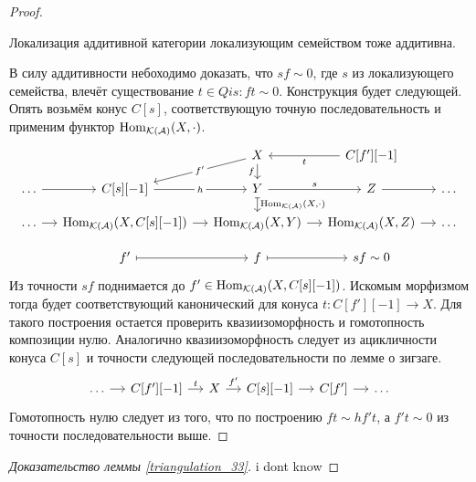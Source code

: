\documentclass[../hw_main.tex]{subfiles}
\begin{document}
\begin{proof}
\begin{to_lem}
Локализация аддитивной категории локализующим семейством тоже аддитивна.
\end{to_lem}
В силу аддитивности небоходимо доказать, что $sf\sim 0$, где $s$ из локализующего семейства, влечёт существование $t\in Qis: ft\sim 0$.
Конструкция будет следующей. Опять возьмём конус $C[s]$, соответствующую точную последовательность и применим функтор $\operatorname{Hom}_{\mathcal{K}(\mathcal{A})}(X, \cdot)$.
    \begin{equation*}
        \begin{tikzcd}[sep=small]
	&& X&C[f'][-1] \\
	\ldots & {C[s][-1]} & Y & Z & \ldots \\
	\ldots & {\Hom_{\mathcal{K}(\mathcal{A})}(X, C[s][-1])} & {\Hom_{\mathcal{K}(\mathcal{A})}(X, Y)} & {\Hom_{\mathcal{K}(\mathcal{A})}(X, Z)} & \ldots \\
	& {f'} & f & {sf\sim 0}
    \arrow[from=1-4, to=1-3, "t"]
	\arrow["h"{description}, from=2-2, to=2-3]
	\arrow["s", from=2-3, to=2-4]
	\arrow[from=2-4, to=2-5]
	\arrow[from=2-1, to=2-2]
	\arrow["{\Hom_{\mathcal{K}(\mathcal{A})}(X, \cdot)}", maps to, from=2-3, to=3-3]
	\arrow[from=3-2, to=3-3]
	\arrow[from=3-1, to=3-2]
	\arrow[from=3-3, to=3-4]
	\arrow[from=3-4, to=3-5]
	\arrow["f"', from=1-3, to=2-3]
	\arrow[maps to, from=4-3, to=4-4]
	\arrow[maps to, from=4-2, to=4-3]
    \arrow[from=1-3, to=2-2, "f'"{description}]
\end{tikzcd}
    \end{equation*}
Из точности $sf$ поднимается до $f'\in \operatorname{Hom}_{\mathcal{K}(\mathcal{A})}(X, C[s][-1])$. Искомым морфизмом тогда будет соответствующий канонический для конуса $t:C[f'][-1]\to X$.
Для такого построения остается проверить квазиизоморфность и гомотопность композиции нулю. Аналогично квазиизоморфность следует из ацикличности конуса $C[s]$ и точности следующей последовательности по лемме о зигзаге.
\begin{equation*}
    \begin{tikzcd}[sep=small]
	\ldots & {C[f'][-1]} & X & {C[s][-1]} & {C[f']} & \ldots
	\arrow["t", from=1-2, to=1-3]
	\arrow["f'", from=1-3, to=1-4]
	\arrow[from=1-4, to=1-5]
	\arrow[from=1-5, to=1-6]
	\arrow[from=1-1, to=1-2]
\end{tikzcd}
\end{equation*}
Гомотопность нулю следует из того, что по построению $ft\sim hf't$, а $f't\sim 0$ из точности последовательности выше.
\end{proof}
\begin{proof}[Доказательство леммы \ref{triangulation_33}]
    i dont know
\end{proof}
\end{document}
